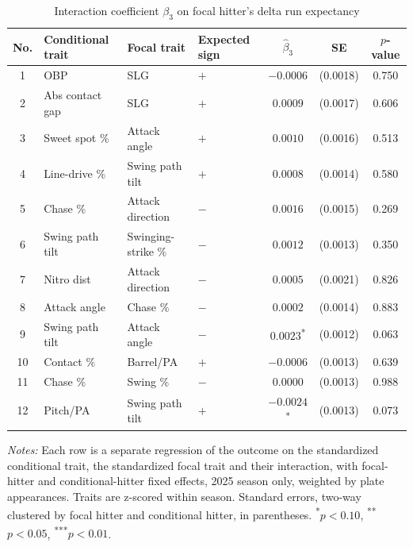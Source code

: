 \begin{table}[htbp]
\centering
\small
\caption{Interaction coefficient $\beta_3$ on focal hitter's delta run expectancy}
\label{tab:table1_focal_2025}
\begin{tabular}{clllccc}
\toprule
No. & Conditional trait & Focal trait & Expected sign & $\hat\beta_3$ & SE & $p$-value \\
\midrule
1 & OBP & SLG & $+$ & $-0.0006$ & (0.0018) & 0.750 \\
2 & Abs contact gap & SLG & $+$ & $0.0009$ & (0.0017) & 0.606 \\
3 & Sweet spot \% & Attack angle & $+$ & $0.0010$ & (0.0016) & 0.513 \\
4 & Line-drive \% & Swing path tilt & $+$ & $0.0008$ & (0.0014) & 0.580 \\
5 & Chase \% & Attack direction & $-$ & $0.0016$ & (0.0015) & 0.269 \\
6 & Swing path tilt & Swinging-strike \% & $-$ & $0.0012$ & (0.0013) & 0.350 \\
7 & Nitro dist & Attack direction & $-$ & $0.0005$ & (0.0021) & 0.826 \\
8 & Attack angle & Chase \% & $-$ & $0.0002$ & (0.0014) & 0.883 \\
9 & Swing path tilt & Attack angle & $-$ & $0.0023$\textsuperscript{*} & (0.0012) & 0.063 \\
10 & Contact \% & Barrel/PA & $+$ & $-0.0006$ & (0.0013) & 0.639 \\
11 & Chase \% & Swing \% & $-$ & $0.0000$ & (0.0013) & 0.988 \\
12 & Pitch/PA & Swing path tilt & $+$ & $-0.0024$\textsuperscript{*} & (0.0013) & 0.073 \\
\bottomrule
\end{tabular}
\par\smallskip\parbox{0.95\textwidth}{\footnotesize \textit{Notes:} Each row is a separate regression of the outcome on the standardized conditional trait, the standardized focal trait and their interaction, with focal-hitter and conditional-hitter fixed effects, 2025 season only, weighted by plate appearances. Traits are z-scored within season. Standard errors, two-way clustered by focal hitter and conditional hitter, in parentheses. \textsuperscript{*}$p<0.10$, \textsuperscript{**}$p<0.05$, \textsuperscript{***}$p<0.01$.}
\end{table}
